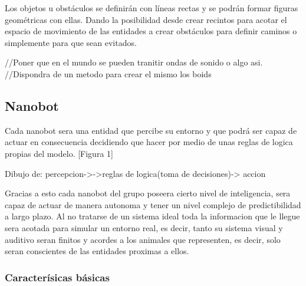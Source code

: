 Los objetos u obstáculos se definirán con líneas rectas y se podrán formar figuras geométricas con ellas.  Dando la posibilidad desde crear recintos para acotar el espacio de movimiento de las entidades a crear obstáculos para definir caminos o simplemente para que sean evitados.
 
 
//Poner que en el mundo se pueden tranitir ondas de sonido o algo asi.
//Dispondra de un metodo para crear el mismo los boids

\subsection{Nanobot}
\label{sec:nanobot}

Cada nanobot sera una entidad que percibe su entorno y que podrá ser capaz de actuar en consecuencia decidiendo que hacer por medio de unas reglas de logica propias del modelo. [Figura 1]

Dibujo de:
  percepcion->->reglas de logica(toma de decisiones)-> accion

Gracias a esto cada nanobot del grupo poseera cierto nivel de inteligencia, sera capaz de actuar de manera autonoma y  tener un nivel complejo de predictibilidad  a largo plazo. Al no tratarse de un sistema ideal toda la informacion que le llegue sera acotada para simular un entorno real, es decir, tanto su sistema visual y auditivo seran finitos y acordes a los animales que representen, es decir, solo seran conscientes de las entidades proximas a ellos.

\subsubsection{Caracterísicas básicas}
\label{sec:caracteristicas_basicas}

